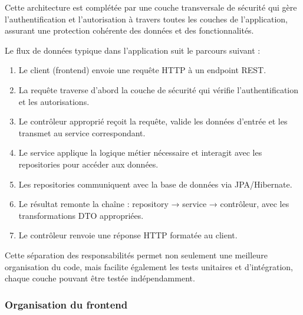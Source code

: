 \begin{tcolorbox}[
  title={\textbf{Architecture sécurisée}},
  colback=blue!5!white,
  colframe=primarycolor,
  fonttitle=\bfseries,
  boxrule=0.5mm,
  arc=2mm,
  left=6mm,
  right=6mm,
  top=6mm,
  bottom=6mm
]
Cette architecture est complétée par une couche transversale de sécurité qui gère l'authentification et l'autorisation à travers toutes les couches de l'application, assurant une protection cohérente des données et des fonctionnalités.
\end{tcolorbox}

\newpage

\noindent Le flux de données typique dans l'application suit le parcours suivant :

\begin{enumerate}[itemsep=0.3em]
  \item Le client (frontend) envoie une requête HTTP à un endpoint REST.
  \item La requête traverse d'abord la couche de sécurité qui vérifie l'authentification et les autorisations.
  \item Le contrôleur approprié reçoit la requête, valide les données d'entrée et les transmet au service correspondant.
  \item Le service applique la logique métier nécessaire et interagit avec les repositories pour accéder aux données.
  \item Les repositories communiquent avec la base de données via JPA/Hibernate.
  \item Le résultat remonte la chaîne : repository → service → contrôleur, avec les transformations DTO appropriées.
  \item Le contrôleur renvoie une réponse HTTP formatée au client.
\end{enumerate}

\vspace{0.5cm}

\begin{note}
Cette séparation des responsabilités permet non seulement une meilleure organisation du code, mais facilite également les tests unitaires et d'intégration, chaque couche pouvant être testée indépendamment.
\end{note}

\subsubsection{Organisation du frontend}

\vspace{0.5cm}

